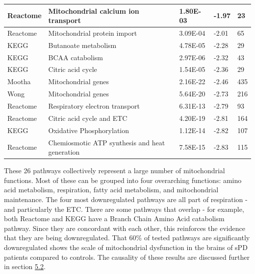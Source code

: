 \documentclass{article}
\begin{document}
\begin{table}[h]
\begin{tabular}{|l|l|l|l|l|}
Reactome       & Mitochondrial calcium ion transport            & 1.80E-03 & -1.97 & 23           \\ \hline
Reactome       & Mitochondrial protein import                   & 3.09E-04 & -2.01 & 65           \\ \hline
KEGG           & Butanoate metabolism                           & 4.78E-05 & -2.28 & 29           \\ \hline
KEGG           & BCAA catabolism                                & 2.97E-06 & -2.32 & 43           \\ \hline
KEGG           & Citric acid cycle                              & 1.54E-05 & -2.36 & 29           \\ \hline
Mootha         & Mitochondrial genes                            & 2.16E-22 & -2.46 & 435          \\ \hline
Wong           & Mitochondrial genes                            & 5.64E-20 & -2.73 & 216          \\ \hline
Reactome       & Respiratory electron transport                 & 6.31E-13 & -2.79 & 93           \\ \hline
Reactome       & Citric acid cycle and ETC                      & 4.20E-19 & -2.81 & 164          \\ \hline
KEGG           & Oxidative Phosphorylation                      & 1.12E-14 & -2.82 & 107          \\ \hline
Reactome       & Chemiosmotic ATP synthesis and heat generation & 7.58E-15 & -2.83 & 115          \\ \hline
\end{tabular}
\end{table}
These 26 pathways collectively represent a large number of mitochondrial functions. Most of these can be grouped into four overarching functions: amino acid metabolism, respiration, fatty acid metabolism, and mitochondrial maintenance. The four most downregulated pathways are all part of respiration - and particularly the ETC. There are some pathways that overlap - for example, both Reactome and KEGG have a Branch Chain Amino Acid catabolism pathway. Since they are concordant with each other, this reinforces the evidence that they are being downregulated. That 60\% of tested pathways are significantly downregulated shows the scale of mitochondrial dysfunction in the brains of sPD patients compared to controls. The causality of these results are discussed further in section
\hyperref[subsubsec:causality]{5.2}.
\\
\end{document}
